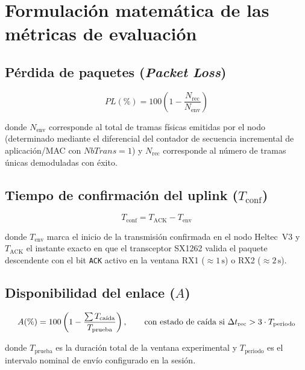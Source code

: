 \documentclass[12pt,oneside,openany,spanish,oldfontcommands]{memoir}
\begin{document}
\section{Formulación matemática de las métricas de evaluación}

\subsection{Pérdida de paquetes (\textit{Packet Loss})}

\begin{equation}
PL(\%) =
100\left(
1-\frac{N_{\mathrm{rec}}}{N_{\mathrm{env}}}
\right)
\label{eq:packetloss}
\end{equation}

donde $N_{\mathrm{env}}$ corresponde al total de tramas físicas emitidas por el nodo (determinado
mediante el diferencial del contador de secuencia incremental de aplicación/MAC con $NbTrans = 1$)
y $N_{\mathrm{rec}}$ corresponde al número de tramas únicas demoduladas con éxito.

\subsection{Tiempo de confirmación del uplink ($T_{\mathrm{conf}}$)}

\begin{equation}
T_{\mathrm{conf}} = T_{\mathrm{ACK}} - T_{\mathrm{env}}
\label{eq:tconf}
\end{equation}

donde $T_{\mathrm{env}}$ marca el inicio de la transmisión confirmada en el nodo Heltec~V3 y
$T_{\mathrm{ACK}}$ el instante exacto en que el transceptor SX1262 valida el paquete descendente
con el bit \texttt{ACK} activo en la ventana RX1 ($\approx 1\,\text{s}$) o RX2 ($\approx 2\,\text{s}$).

\subsection{Disponibilidad del enlace ($A$)}

\begin{equation}
A(\%) =
100\left(1 - \frac{\sum T_{\text{ca\'{\i}da}}}{T_{\text{prueba}}}\right),
\qquad \text{con estado de ca\'{\i}da si } \Delta t_{\text{rec}} > 3 \cdot T_{\text{periodo}}
\label{eq:availability}
\end{equation}

donde $T_{\text{prueba}}$ es la duración total de la ventana experimental y $T_{\text{periodo}}$ es
el intervalo nominal de envío configurado en la sesión.
\end{document}
